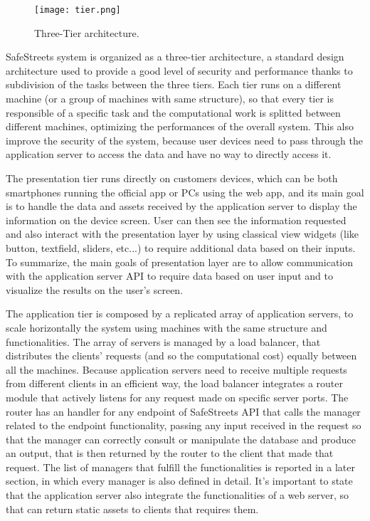 \begin{figure}[H]
	\centering
	\texttt{[image: tier.png]}
	\caption{Three-Tier architecture.}
\end{figure}

SafeStreets system is organized as a three-tier architecture, a standard design architecture used to provide a good level of security and performance thanks to subdivision of the tasks between the three tiers. Each tier runs on a different machine (or a group of machines with same structure), so that every tier is responsible of a specific task and the computational work is splitted between different machines, optimizing the performances of the overall system. This also improve the security of the system, because user devices need to pass through the application server to access the data and have no way to directly access it. 

The presentation tier runs directly on customers devices, which can be both smartphones running the official app or PCs using the web app, and its main goal is to handle the data and assets received by the application server to display the information on the device screen. User can then see the information requested and also interact with the presentation layer by using classical view widgets (like button, textfield, sliders, etc...) to require additional data based on their inputs. To summarize, the main goals of presentation layer are to allow communication with the application server API to require data based on user input and to visualize the results on the user's screen.

The application tier is composed by a replicated array of application servers, to scale horizontally the system using machines with the same structure and functionalities. The array of servers is managed by a load balancer, that distributes the clients' requests (and so the computational cost) equally between all the machines. Because application servers need to receive multiple requests from different clients in an efficient way, the load balancer integrates a router module that actively listens for any request made on specific server ports. The router has an handler for any endpoint of SafeStreets API that calls the manager related to the endpoint functionality, passing any input received in the request so that the manager can correctly consult or manipulate the database and produce an output, that is then returned by the router to the client that made that request. The list of managers that fulfill the functionalities is reported in a later section, in which every manager is also defined in detail. It's important to state that the application server also integrate the functionalities of a web server, so that can return static assets to clients that requires them.

